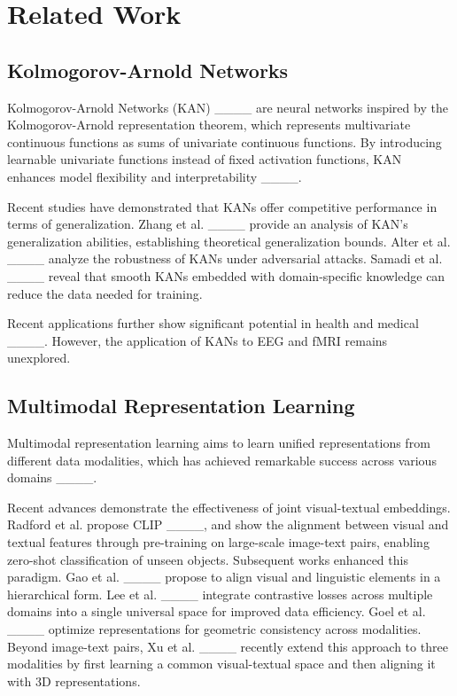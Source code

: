\section{Related Work}
\label{sec:related_work}

\subsection{Kolmogorov-Arnold Networks}

Kolmogorov-Arnold Networks (KAN) ____ are neural networks inspired by the Kolmogorov-Arnold representation theorem, which represents multivariate continuous functions as sums of univariate continuous functions. By introducing learnable univariate functions instead of fixed activation functions, KAN enhances model flexibility and interpretability ____.

Recent studies have demonstrated that KANs offer competitive performance in terms of generalization. Zhang et al. ____ provide an analysis of KAN's generalization abilities, establishing theoretical generalization bounds. Alter et al. ____ analyze the robustness of KANs under adversarial attacks. Samadi et al. ____ reveal that smooth KANs embedded with domain-specific knowledge can reduce the data needed for training.
 
Recent applications further show significant potential in health and medical ____. However, the application of KANs to EEG and fMRI remains unexplored.

\subsection{Multimodal Representation Learning}

Multimodal representation learning aims to learn unified representations from different data modalities, which has achieved remarkable success across various domains ____.

Recent advances demonstrate the effectiveness of joint visual-textual embeddings.  Radford et al. propose CLIP ____, and show the alignment between visual and textual features through pre-training on large-scale image-text pairs, enabling zero-shot classification of unseen objects. Subsequent works enhanced this paradigm. Gao et al. ____ propose to align visual and linguistic elements in a hierarchical form. Lee et al. ____ integrate contrastive losses across multiple domains into a single universal space for improved data efficiency. Goel et al. ____ optimize representations for geometric consistency across modalities. Beyond image-text pairs, Xu et al. ____ recently extend this approach to three modalities by first learning a common visual-textual space and then aligning it with 3D representations.

